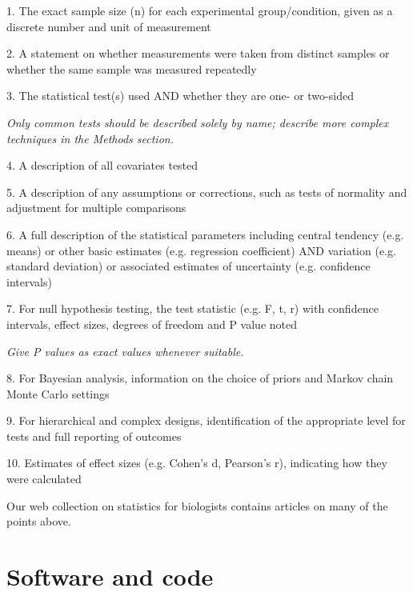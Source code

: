 \documentclass{article}
\begin{document}
\begin{hangpars}
1. The exact sample size (n) for each experimental group/condition, given as a discrete number and unit of measurement

2. A statement on whether measurements were taken from distinct samples or whether the same sample was measured repeatedly

3. The statistical test(s) used AND whether they are one- or two-sided

\emph{Only common tests should be described solely by name; describe more complex techniques in the Methods section.}

4. A description of all covariates tested

5. A description of any assumptions or corrections, such as tests of normality and adjustment for multiple comparisons

6. A full description of the statistical parameters including central tendency (e.g. means) or other basic estimates (e.g. regression coefficient) AND variation (e.g. standard deviation) or associated estimates of uncertainty (e.g. confidence intervals)

7. For null hypothesis testing, the test statistic (e.g. F, t, r) with confidence intervals, effect sizes, degrees of freedom and P value noted

\emph{Give P values as exact values whenever suitable.}

8. For Bayesian analysis, information on the choice of priors and Markov chain Monte Carlo settings

9. For hierarchical and complex designs, identification of the appropriate level for tests and full reporting of outcomes

10. Estimates of effect sizes (e.g. Cohen's d, Pearson's r), indicating how they were calculated

\end{hangpars}
\noindent Our web collection on statistics for biologists contains articles on many of the points above.

\section*{Software and code}
\end{document}
